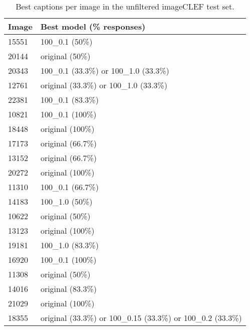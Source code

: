 \documentclass[11pt]{article}
\begin{document}
\begin{table}[h]
    \begin{center}
        \begin{tabular}{|p{1cm}|p{4.5cm}|}
            \hline \bf Image & \bf Best model (\% responses)                                \\ \hline
            15551            & 100\_0.1 (50\%)                                              \\
            20144            & original (50\%)                                              \\
            20343            & 100\_0.1 (33.3\%) or 100\_1.0 (33.3\%)                       \\
            12761            & original (33.3\%) or 100\_1.0 (33.3\%)                       \\
            22381            & 100\_0.1 (83.3\%)                                            \\
            10821            & 100\_0.1 (100\%)                                             \\
            18448            & original (100\%)                                             \\
            17173            & original (66.7\%)                                            \\
            13152            & original (66.7\%)                                            \\
            20272            & original (100\%)                                             \\
            11310            & 100\_0.1 (66.7\%)                                            \\
            14183            & 100\_1.0 (50\%)                                              \\
            10622            & original (50\%)                                              \\
            13123            & original (100\%)                                             \\
            19181            & 100\_1.0 (83.3\%)                                            \\
            16920            & 100\_0.1 (100\%)                                             \\
            11308            & original (50\%)                                              \\
            14016            & original (83.3\%)                                            \\
            21029            & original (100\%)                                             \\
            18355            & original (33.3\%) or 100\_0.15 (33.3\%) or 100\_0.2 (33.3\%) \\
            \hline
        \end{tabular}
    \end{center}
    \caption{\label{unfiltered-table} Best captions per image in the unfiltered imageCLEF test set. }
\end{table}
\end{document}

